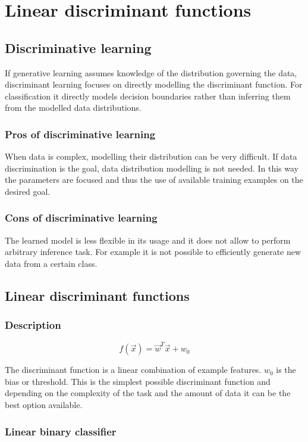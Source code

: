 \chapter{Linear discriminant functions}

\section{Discriminative learning}
If generative learning assumes knowledge of the distribution governing the data, discriminant learning focuses on directly modelling the discriminant function.
For classification it directly models decision boundaries rather than inferring them from the modelled data distributions.

	\subsection{Pros of discriminative learning}
	When data is complex, modelling their distribution can be very difficult.
	If data discrimination is the goal, data distribution modelling is not needed.
	In this way the parameters are focused and thus the use of available training examples on the desired goal.

	\subsection{Cons of discriminative learning}
	The learned model is less flexible in its usage and it does not allow to perform arbitrary inference task.
	For example it is not possible to efficiently generate new data from a certain class.

\section{Linear discriminant functions}

	\subsection{Description}

	$$f(\vec{x}) = \vec{w}^T\vec{x}+w_0$$

	The discriminant function is a linear combination of example features.
	$w_0$ is the bias or threshold.
	This is the simplest possible discriminant function and depending on the complexity of the task and the amount of data it can be the best option available.

	\subsection{Linear binary classifier}

